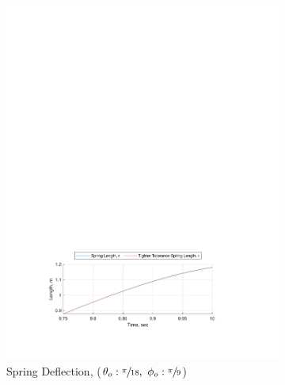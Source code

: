 \documentclass[12pt]{report}
\begin{document}
\begin{flushleft}
\begin{figure}[!htp]
\begin{subfigure}{\textwidth}
    \includegraphics[center]{2}
    \caption*{Spring Deflection, ($\theta_o:\sfrac{\pi}{18},~\phi_o:\sfrac{\pi}{9}$)}
  \end{subfigure}
  \begin{subfigure}{\textwidth}

\end{subfigure}
\end{figure}
\end{flushleft}
\end{document}
